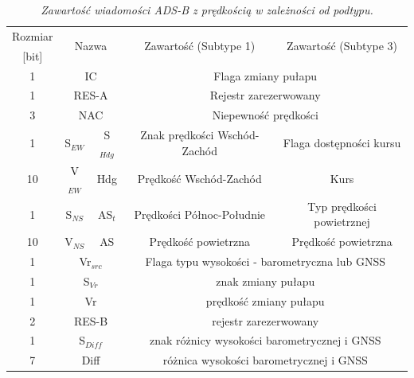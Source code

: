 \documentclass[eng,printmode]{mgr}
\begin{document}
\begin{table}[htb]
\def\arraystretch{1.3}%
\caption{\textit{ Zawartość wiadomości ADS-B z prędkością w zależności od podtypu.}}
\label{tab:adsb}
  \centering
  \def\arraystretch{1.2}%
  \begin{tabular}{|c|c|c|c|c|}
  \hline
  \multicolumn{1}{|c|}{Rozmiar} & \multicolumn{2}{c|}{\multirow{2}{*}{Nazwa}} & \multicolumn{1}{c|}{\multirow{2}{*}{Zawartość (Subtype 1)}}  & \multicolumn{1}{c|}{\multirow{2}{*}{Zawartość (Subtype 3)}}\\
  \multicolumn{1}{|c|}{[bit]} & \multicolumn{2}{c|}{} & \multicolumn{1}{c|}{}& \multicolumn{1}{c|}{}\\\cline{1-5}
  
  \multicolumn{1}{|c|}{1} & \multicolumn{2}{c|}{IC} & \multicolumn{2}{c|}{Flaga zmiany pułapu}\\\cline{1-5}
  \multicolumn{1}{|c|}{1} & \multicolumn{2}{c|}{RES-A} & \multicolumn{2}{c|}{Rejestr zarezerwowany}\\\cline{1-5}
  \multicolumn{1}{|c|}{3} & \multicolumn{2}{c|}{NAC} & \multicolumn{2}{c|}{Niepewność prędkości}\\\cline{1-5}
  \multicolumn{1}{|c|}{1} & \multicolumn{1}{c|}{S$_{EW}$} & \multicolumn{1}{c|}{S$_{Hdg}$} & \multicolumn{1}{c|}{Znak prędkości Wschód-Zachód} & \multicolumn{1}{c|}{Flaga dostępności kursu} \\\cline{1-5}
  \multicolumn{1}{|c|}{10} & \multicolumn{1}{c|}{V$_{EW}$} & \multicolumn{1}{c|}{Hdg} & \multicolumn{1}{c|}{Prędkość Wschód-Zachód}& \multicolumn{1}{c|}{Kurs}\\\cline{1-5}
  \multicolumn{1}{|c|}{1} & \multicolumn{1}{c|}{S$_{NS}$} & \multicolumn{1}{c|}{AS$_t$} & \multicolumn{1}{c|}{Prędkości Północ-Południe} & \multicolumn{1}{c|}{Typ prędkości powietrznej}\\\cline{1-5}
  \multicolumn{1}{|c|}{10} & \multicolumn{1}{c|}{V$_{NS}$} & \multicolumn{1}{c|}{AS}  & \multicolumn{1}{c|}{Prędkość powietrzna}& \multicolumn{1}{c|}{Prędkość powietrzna}\\\cline{1-5}
  \multicolumn{1}{|c|}{1} & \multicolumn{2}{c|}{Vr$_{src}$} & \multicolumn{2}{c|}{Flaga typu wysokości - barometryczna lub GNSS}\\\cline{1-5}
  \multicolumn{1}{|c|}{1} & \multicolumn{2}{c|}{S$_{Vr}$} & \multicolumn{2}{c|}{znak zmiany pułapu}\\\cline{1-5}
  \multicolumn{1}{|c|}{1} & \multicolumn{2}{c|}{Vr} & \multicolumn{2}{c|}{prędkość zmiany pułapu}\\\cline{1-5}
  \multicolumn{1}{|c|}{2} & \multicolumn{2}{c|}{RES-B} & \multicolumn{2}{c|}{rejestr zarezerwowany}\\\cline{1-5}
  \multicolumn{1}{|c|}{1} & \multicolumn{2}{c|}{S$_{Diff}$} & \multicolumn{2}{c|}{znak różnicy wysokości barometrycznej i GNSS}\\\cline{1-5}
  \multicolumn{1}{|c|}{7} & \multicolumn{2}{c|}{Diff} & \multicolumn{2}{c|}{różnica wysokości barometrycznej i GNSS}\\\cline{1-5}
       
 \end{tabular}
\end{table}
\end{document}

